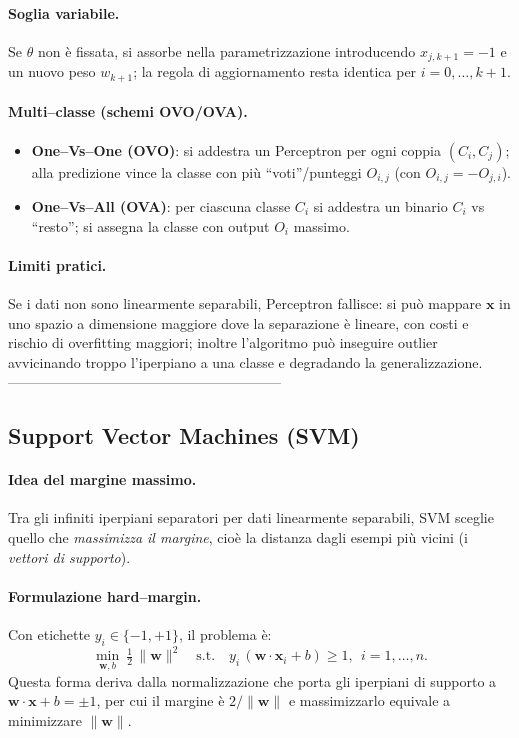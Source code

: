 \paragraph{Soglia variabile.}
Se \(\theta\) non è fissata, si assorbe nella parametrizzazione introducendo \(x_{j,k+1}=-1\) e un nuovo peso \(w_{k+1}\); la regola di aggiornamento resta identica per \(i=0,\dots,k{+}1\). %

\paragraph{Multi–classe (schemi OVO/OVA).}
\begin{itemize}
  \item \textbf{One–Vs–One (OVO)}: si addestra un Perceptron per ogni coppia \((C_i,C_j)\); alla predizione vince la classe con più “voti”/punteggi \(O_{i,j}\) (con \(O_{i,j}=-O_{j,i}\)). %
  \item \textbf{One–Vs–All (OVA)}: per ciascuna classe \(C_i\) si addestra un binario \(C_i\) vs “resto”; si assegna la classe con output \(O_i\) massimo. %
\end{itemize}

\paragraph{Limiti pratici.}
Se i dati non sono linearmente separabili, Perceptron fallisce: si può mappare \(\mathbf{x}\) in uno spazio a dimensione maggiore dove la separazione è lineare, con costi e rischio di overfitting maggiori; inoltre l’algoritmo può inseguire outlier avvicinando troppo l’iperpiano a una classe e degradando la generalizzazione. -----------------------------------------------------------
\subsection{Support Vector Machines (SVM)}\label{subsec:svm}
\paragraph{Idea del margine massimo.}
Tra gli infiniti iperpiani separatori per dati linearmente separabili, SVM sceglie quello che \emph{massimizza il margine}, cioè la distanza dagli esempi più vicini (i \emph{vettori di supporto}). %

\paragraph{Formulazione hard–margin.}
Con etichette \(y_i\in\{-1,+1\}\), il problema è:
\[
\min_{\mathbf{w},b}\ \tfrac{1}{2}\,\lVert \mathbf{w}\rVert^2\quad\text{s.t.}\quad y_i\,(\mathbf{w}\!\cdot\!\mathbf{x}_i+b)\ge 1,\ \ i=1,\dots,n.
\]
Questa forma deriva dalla normalizzazione che porta gli iperpiani di supporto a \( \mathbf{w}\!\cdot\!\mathbf{x}+b=\pm 1\), per cui il margine è \(2/\lVert\mathbf{w}\rVert\) e massimizzarlo equivale a minimizzare \(\lVert\mathbf{w}\rVert\). %

